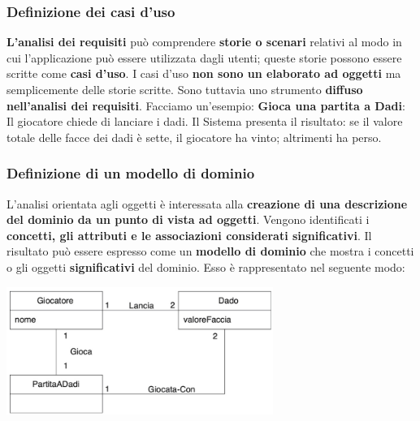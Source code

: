 \documentclass[12pt]{article}
\begin{document}
\subsubsection{Definizione dei casi d'uso}

\textbf{L'analisi dei requisiti} può comprendere \textbf{storie o scenari} relativi al modo in cui l'applicazione può essere utilizzata dagli utenti;
queste storie possono essere scritte come \textbf{casi d'uso}. I casi d'uso \textbf{non sono un elaborato ad oggetti} ma semplicemente delle storie scritte. Sono tuttavia
uno strumento \textbf{diffuso nell'analisi dei requisiti}. Facciamo un'esempio: \newline
\textbf{Gioca una partita a Dadi}: Il giocatore chiede di lanciare i dadi. Il Sistema presenta il risultato: se il valore totale delle facce dei dadi è sette, il giocatore ha vinto; altrimenti ha perso.
\subsubsection{Definizione di un modello di dominio}
L'analisi orientata agli oggetti è interessata alla \textbf{creazione di una descrizione del dominio da un punto di vista ad oggetti}. Vengono identificati i \textbf{concetti, gli attributi e le associazioni considerati significativi}.
Il risultato può essere espresso come un \textbf{modello di dominio} che mostra i concetti o gli oggetti \textbf{significativi} del dominio. Esso è rappresentato nel seguente modo:
\begin{center}
    \includegraphics[width = 0.65\textwidth]{Images/7.png}
\end{center}
\end{document}
